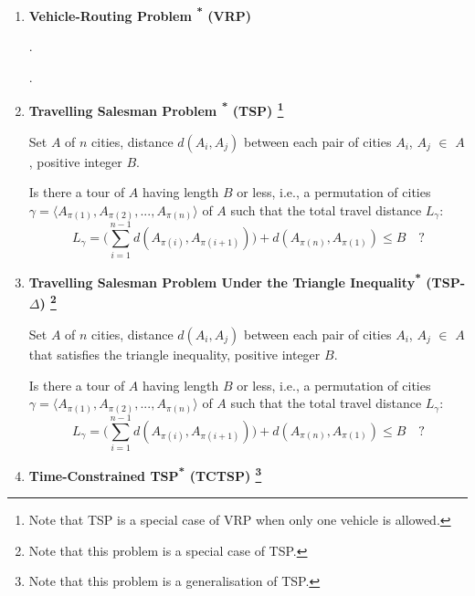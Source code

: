 \documentclass{mprop}
\theoremstyle{definition}
\begin{document}
\begin{enumerate}

\item \textbf{Vehicle-Routing Problem \textsuperscript{*} (VRP)}
\begin{instance}
.
\end{instance}
\begin{question}
.
\end{question}

\item \textbf{Travelling Salesman Problem \textsuperscript{*} (TSP) \footnote{Note that TSP is a special case of VRP when only one vehicle is allowed.}}
\begin{instance}
Set $A$ of $n$ cities, distance $d(A_{i}, A_{j})$ between each pair of cities $A_{i}$, $A_{j}$ $\in$ $A$, positive integer $B$.
\end{instance}

\begin{question}
Is there a tour of $A$ having length $B$ or less, i.e., a permutation of cities $\gamma = \langle A_{\pi(1)}, A_{\pi(2)},...,A_{\pi(n)} \rangle $ of $A$ such that the total travel distance $L_{\gamma}$:
$$L_{\gamma} = \bigg( \sum_{i=1}^{n-1} d(A_{\pi(i)}, A_{\pi(i+1)}) \bigg) + d(A_{\pi(n)}, A_{\pi(1)}) \leq B \quad \textrm{?}$$
\end{question}

\item \textbf{Travelling Salesman Problem Under the Triangle Inequality\textsuperscript{*} (TSP-$\Delta$) \footnote{Note that this problem is a special case of TSP.}}
\begin{instance}
Set $A$ of $n$ cities, distance $d(A_{i}, A_{j})$ between each pair of cities $A_{i}$, $A_{j}$ $\in$ $A$ that satisfies the triangle inequality, positive integer $B$.
\end{instance}

\begin{question}
Is there a tour of $A$ having length $B$ or less, i.e., a permutation of cities $\gamma = \langle A_{\pi(1)}, A_{\pi(2)},...,A_{\pi(n)} \rangle $ of $A$ such that the total travel distance $L_{\gamma}$:
$$L_{\gamma} = \bigg( \sum_{i=1}^{n-1} d(A_{\pi(i)}, A_{\pi(i+1)}) \bigg) + d(A_{\pi(n)}, A_{\pi(1)}) \leq B \quad \textrm{?}$$
\end{question}

\item \textbf{Time-Constrained TSP\textsuperscript{*} (TCTSP) \footnote{Note that this problem is a generalisation of TSP.}}


\end{enumerate}
\end{document}
